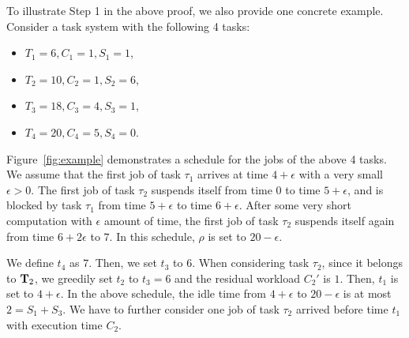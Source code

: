 To illustrate Step 1 in the above proof, we also provide one concrete example. Consider a task system with the following 4 tasks:
\begin{itemize}
\item $T_1 = 6, C_1 = 1, S_1 = 1$,
\item $T_2 = 10, C_2 = 1, S_2 = 6$,
\item $T_3 = 18, C_3 = 4, S_3 = 1$,
\item $T_4 = 20, C_4 = 5, S_4 = 0$.
\end{itemize}

Figure~\ref{fig:example} demonstrates a schedule for the jobs of the
above 4 tasks. We assume that the first job of task $\tau_1$ arrives
at time $4+\epsilon$ with a very small $\epsilon > 0$. The first job
of task $\tau_2$ suspends itself from time $0$ to time $5+\epsilon$,
and is blocked by task $\tau_1$ from time $5+\epsilon$ to time
$6+\epsilon$. After some very short computation with $\epsilon$ amount
of time, the first job of task $\tau_2$ suspends itself again from
time $6+2\epsilon$ to $7$.   In this schedule, $\rho$ is set to $20-\epsilon$.

We define $t_4$ as $7$. Then, we set $t_3$ to $6$. When considering
task $\tau_2$, since it belongs to ${\bf T}_2$, we greedily set $t_2$
to $t_3=6$ and the residual workload $C_2'$ is $1$. Then, $t_1$ is set
to $4+\epsilon$. In the above schedule, the idle time from
$4+\epsilon$ to $20-\epsilon$ is at most $2 = S_1+S_3$. We have to
further consider one job of task $\tau_2$ arrived before time $t_1$
with execution time $C_2$.
  
  
  

